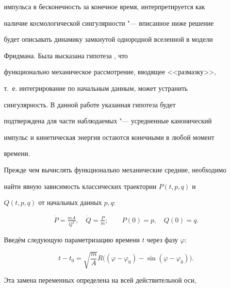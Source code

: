 импульса в бесконечность за конечное время, интерпретируется как

наличие космологической сингулярности "--- вписанное ниже решение

будет описывать динамику замкнутой однородной вселенной в модели

Фридмана. Была высказана гипотеза \cite{Volovich_BH}, что

функционально механическое рассмотрение, вводящее <<размазку>>,

т.~е. интегрирование по начальным данным, может устранить

сингулярность. В данной работе указанная гипотеза будет

подтверждена для части наблюдаемых "--- усредненные канонический

импульс и кинетическая энергия остаются конечными в любой момент

времени.




Прежде чем вычислять функционально механические средние, необходимо

найти явную зависимость классических траектории $P(t,p,q)$ и

$Q(t,p,q)$ от начальных данных $p,q$:

\begin{gather}

\dot{P}=\frac{mA}{Q^2}, 

\quad 

\dot{Q}=\frac{P}{m}; \qquad

P(0)=p, \quad  Q(0)=q.

\end{gather}



Введём следующую параметризацию времени $t$ через фазу $\varphi$:

\begin{equation}

t- t_0=\sqrt{\frac{m}{A}}R\bigl((\varphi -\varphi_0)-\sin(\varphi

-\varphi_0)\bigr).

\label{cicl_time} %

\end{equation}

Эта замена переменных определена на всей действительной оси,

